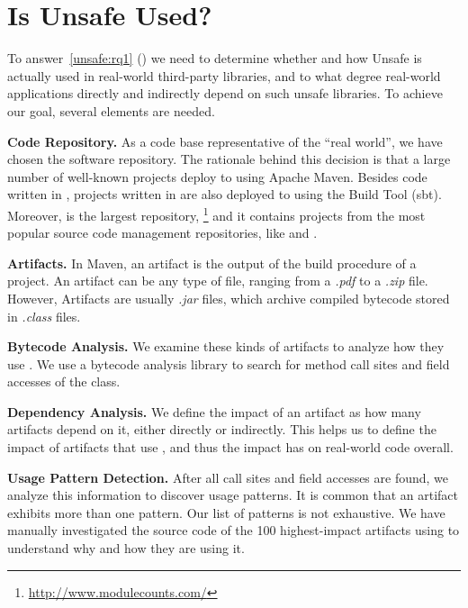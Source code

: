 \section{Is Unsafe Used?}
\label{sec:unsafe:overview}

To answer~\ref{unsafe:rq1} (\emph{\urqA})
we need to determine whether and how Unsafe is actually used in real-world third-party \java{} libraries,
and to what degree real-world applications directly and indirectly depend on such unsafe libraries.
To achieve our goal, several elements are needed.

\textbf{Code Repository.}
As a code base representative of the ``real world'',
we have chosen the \mavencentral{} software repository.
The rationale behind this decision is that a large number of well-known \java{} projects deploy to \mavencentral{} using Apache Maven.
Besides code written in \java{},
projects written in  are also deployed to \mavencentral{} using the \scala{} Build Tool (sbt).
Moreover, \mavencentral{} is the largest \java{} repository,%
\footnote{\url{http://www.modulecounts.com/}}
and it contains projects from the most popular source code management repositories, like \github{} and \sourceforge{}.

\textbf{Artifacts.}
In Maven, an artifact is the output of the build procedure of a project.
An artifact can be any type of file, ranging from a \emph{.pdf} to a \emph{.zip} file.
However, Artifacts are usually \emph{.jar} files,
which archive compiled \java{} bytecode stored in \emph{.class} files.

\textbf{Bytecode Analysis.}
We examine these kinds of artifacts to analyze how they use .
We use a bytecode analysis library to search for method call sites and field accesses of the  class.

\textbf{Dependency Analysis.}
We define the impact of an artifact as how many artifacts depend on it,
either directly or indirectly.
This helps us to define the impact of artifacts that use ,
and thus the impact  has on real-world code overall.

\textbf{Usage Pattern Detection.}
After all call sites and field accesses are found,
we analyze this information to discover usage patterns.
It is common that an artifact exhibits more than one pattern.
Our list of patterns is not exhaustive.
We have manually investigated the source code of the 100 highest-impact artifacts using  to understand why and how they are using it.

